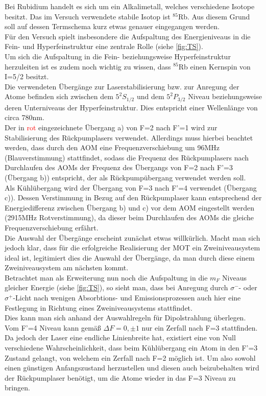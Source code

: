 \documentclass[
class=book,
accentcolor=1b,
custommargins=geometry,
fontsize=11pt,
thesis={type=Versuchsanleitung},
ruledheaders=all,
headline=false,
instbox=false,
marginpar=false,
title=small,
ignore-missing-data=true,
twoside=false,
logofile=apqdesign/tuda_logo.pdf,
pdfa=false %
]{apqpub}
\begin{document}
					Bei Rubidium handelt es sich um ein Alkalimetall, welches verschiedene Isotope besitzt. Das im Versuch verwendete stabile Isotop ist $^{85}$Rb. Aus diesem Grund soll auf dessen Termschema kurz etwas genauer eingegangen werden.\\
					Für den Versuch spielt insbesondere die Aufspaltung des Energieniveaus in die Fein- und Hyperfeinstruktur eine zentrale Rolle (siehe \autoref{fig:TS}).\\
					Um sich die Aufspaltung in die Fein- beziehungsweise Hyperfeinstruktur herzuleiten ist es zudem noch wichtig zu wissen, dass $^{85}$Rb einen Kernspin von I=5/2 besitzt.\\ 
					Die verwendeten Übergänge zur Laserstabilisierung bzw. zur Anregung der Atome befinden sich zwischen dem $5^2S_{1/2}$ und dem $5^2P_{3/2}$ Niveau beziehungsweise deren Unterniveaus der Hyperfeinstruktur. Dies entspricht einer Wellenlänge von circa 780nm.\\
					Der in \textcolor{red}{rot} eingezeichnete Übergang a) von F=2 nach F'=1 wird zur Stabilisierung des Rückpumplasers verwendet. Allerdings muss hierbei beachtet werden, dass durch den AOM eine Frequenzverschiebung um 96MHz (Blauverstimmung) stattfindet, sodass die Frequenz des Rückpumplasers nach Durchlaufen des AOMs der Frequenz des Übergangs von F=2 nach F'=3 (Übergang b)) entspricht, der als Rückpumpübergang verwendet werden soll.\\
					Als Kühlübergang wird der Übergang von F=3 nach F'=4 verwendet (Übergang c)). Dessen Verstimmung in Bezug auf den Rückpumplaser kann entsprechend der Energiedifferenz zwischen Übergang b) und c) vor dem AOM eingestellt werden (2915MHz Rotverstimmung), da dieser beim Durchlaufen des AOMs die gleiche Frequenzverschiebung erfährt.\\   
					Die Auswahl der Übergänge erscheint zunächst etwas willkürlich. Macht man sich jedoch klar, dass für die erfolgreiche Realisierung der MOT ein Zweiniveausystem ideal ist, legitimiert dies die Auswahl der Übergänge, da man durch diese einem Zweiniveausystem am nächsten kommt.\\
					Betrachtet man als Erweiterung nun noch die Aufspaltung in die $m_F$ Niveaus gleicher Energie (siehe \autoref{fig:TS}), so sieht man, dass bei Anregung durch $\sigma^-$- oder $\sigma^+$-Licht nach wenigen Absorbtions- und Emissionsprozessen auch hier eine Festlegung in Richtung eines Zweiniveausystems stattfindet.\\  
					Dies kann man sich anhand der Auswahlregeln für Dipolstrahlung überlegen. Vom F'=4 Niveau kann gemäß $\varDelta F=0,\pm1$ nur ein Zerfall nach F=3 stattfinden. Da jedoch der Laser eine endliche Linienbreite hat, existiert eine von  Null verschiedene Wahrscheinlichkeit, dass beim Kühlübergang ein Atom in den F'=3 Zustand gelangt, von welchem ein Zerfall nach F=2 möglich ist. Um also sowohl einen günstigen Anfangszustand herzustellen und diesen auch beizubehalten wird der Rückpumplaser benötigt, um die Atome wieder in das F=3 Niveau zu bringen.\\
\end{document}
